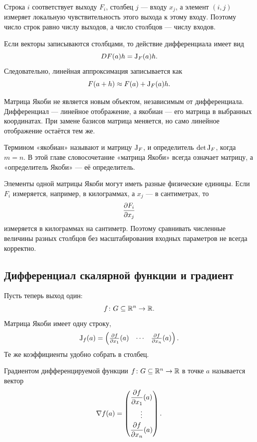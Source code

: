 Строка \(i\) соответствует выходу \(F_i\), столбец \(j\) --- входу \(x_j\), а элемент \((i,j)\) измеряет локальную чувствительность этого выхода к этому входу. Поэтому число строк равно числу выходов, а число столбцов --- числу входов.

Если векторы записываются столбцами, то действие дифференциала имеет вид
\begin{equation}
DF(a)h
=
\mathrm{J}_{F}(a)h.
\label{eq:differential-jacobian-action}
\end{equation}
Следовательно, линейная аппроксимация записывается как
\begin{equation}
F(a+h)
\approx
F(a)+\mathrm{J}_{F}(a)h.
\label{eq:jacobian-linearization}
\end{equation}

Матрица Якоби не является новым объектом, независимым от дифференциала. Дифференциал --- линейное отображение, а якобиан --- его матрица в выбранных координатах. При замене базисов матрица меняется, но само линейное отображение остаётся тем же.

\begin{remark}
Термином «якобиан» называют и матрицу \(\mathrm{J}_{F}\), и определитель \(\det \mathrm{J}_{F}\), когда \(m=n\). В этой главе словосочетание «матрица Якоби» всегда означает матрицу, а «определитель Якоби» --- её определитель.
\end{remark}

\begin{caution}
Элементы одной матрицы Якоби могут иметь разные физические единицы. Если \(F_i\) измеряется, например, в килограммах, а \(x_j\) --- в сантиметрах, то
\[
\frac{\partial F_i}{\partial x_j}
\]
измеряется в килограммах на сантиметр. Поэтому сравнивать численные величины разных столбцов без масштабирования входных параметров не всегда корректно.
\end{caution}

\subsection{Дифференциал скалярной функции и градиент}

Пусть теперь выход один:
\[
f\colon G\subseteq\mathbb{R}^n\to\mathbb{R}.
\]
Матрица Якоби имеет одну строку,
\[
\mathrm{J}_{f}(a)
=
\begin{pmatrix}
\frac{\partial f}{\partial x_1}(a)&\cdots&\frac{\partial f}{\partial x_n}(a)
\end{pmatrix}.
\]
Те же коэффициенты удобно собрать в столбец.

\begin{definition}
Градиентом дифференцируемой функции \(f\colon G\subseteq\mathbb{R}^n\to\mathbb{R}\) в точке \(a\) называется вектор
\begin{equation}
\nabla f(a)
=
\begin{pmatrix}
\dfrac{\partial f}{\partial x_1}(a)\\[0.8em]
\vdots\\[0.3em]
\dfrac{\partial f}{\partial x_n}(a)
\end{pmatrix}.
\label{eq:gradient-definition}
\end{equation}
\end{definition}

